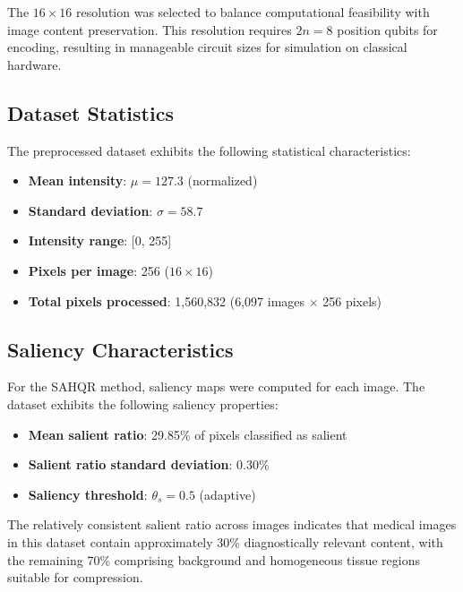 \documentclass[pdflatex,sn-mathphys-num,Numbered]{sn-jnl}
\theoremstyle{thmstyleone}
\theoremstyle{thmstyletwo}
\theoremstyle{thmstylethree}
\begin{document}
The $16 \times 16$ resolution was selected to balance computational feasibility with image content preservation. This resolution requires $2n = 8$ position qubits for encoding, resulting in manageable circuit sizes for simulation on classical hardware.

\subsection{Dataset Statistics}

The preprocessed dataset exhibits the following statistical characteristics:

\begin{itemize}
\item \textbf{Mean intensity}: $\mu = 127.3$ (normalized)
\item \textbf{Standard deviation}: $\sigma = 58.7$
\item \textbf{Intensity range}: [0, 255]
\item \textbf{Pixels per image}: 256 ($16 \times 16$)
\item \textbf{Total pixels processed}: 1,560,832 (6,097 images $\times$ 256 pixels)
\end{itemize}

\subsection{Saliency Characteristics}

For the SAHQR method, saliency maps were computed for each image. The dataset exhibits the following saliency properties:

\begin{itemize}
\item \textbf{Mean salient ratio}: 29.85\% of pixels classified as salient
\item \textbf{Salient ratio standard deviation}: 0.30\%
\item \textbf{Saliency threshold}: $\theta_s = 0.5$ (adaptive)
\end{itemize}

The relatively consistent salient ratio across images indicates that medical images in this dataset contain approximately 30\% diagnostically relevant content, with the remaining 70\% comprising background and homogeneous tissue regions suitable for compression.

\end{document}
